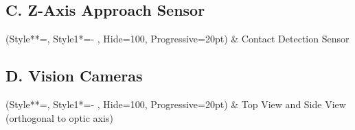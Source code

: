 \subsection{C. Z-Axis Approach Sensor}
\begin{easylist}
\ListProperties(Style**=\sffamily, Style1*={- } , Hide=100, Progressive=20pt)
& Contact Detection Sensor
\end{easylist}

\subsection{D. Vision Cameras}
\begin{easylist}
\ListProperties(Style**=\sffamily, Style1*={- } , Hide=100, Progressive=20pt)
& Top View and Side View (orthogonal to optic axis)
\end{easylist}

